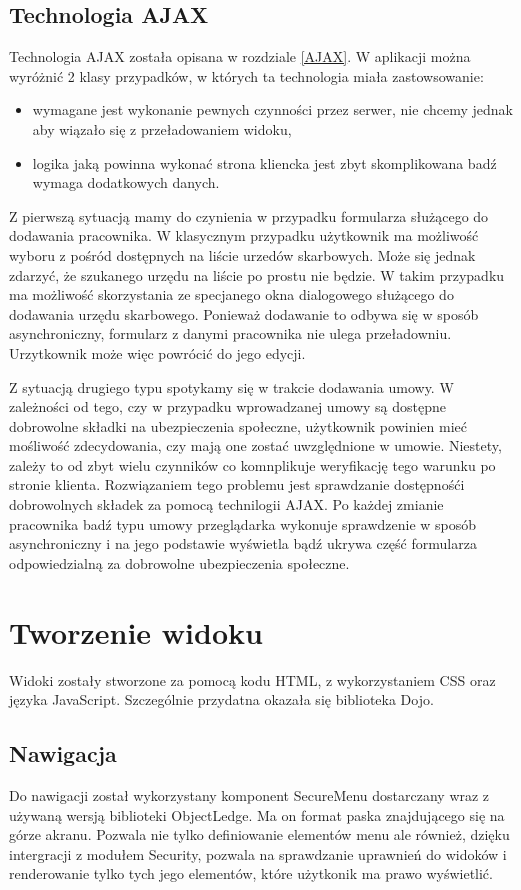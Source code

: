 \subsection[Technologia AJAX][Technologia AJAX]{Technologia AJAX}
Technologia AJAX została opisana w rozdziale \ref{AJAX}. W aplikacji można wyróżnić 2 klasy przypadków, w których ta technologia miała zastowsowanie:
\begin{itemize}
	\item wymagane jest wykonanie pewnych czynności przez serwer, nie chcemy jednak aby wiązało się z przeładowaniem widoku,
	\item logika jaką powinna wykonać strona kliencka jest zbyt skomplikowana badź wymaga dodatkowych danych.
\end{itemize}
Z pierwszą sytuacją mamy do czynienia w przypadku formularza służącego do dodawania pracownika. W klasycznym przypadku użytkownik ma możliwość wyboru z pośród dostępnych na liście urzedów skarbowych. Może się jednak zdarzyć, że szukanego urzędu na liście po prostu nie będzie. W takim przypadku ma możliwość skorzystania ze specjanego okna dialogowego służącego do dodawania urzędu skarbowego. Ponieważ dodawanie to odbywa się w sposób asynchroniczny, formularz z danymi pracownika nie ulega przeładowniu. Urzytkownik może więc powrócić do jego edycji.

Z sytuacją drugiego typu spotykamy się w trakcie dodawania umowy. W zależności od tego, czy w przypadku wprowadzanej umowy są dostępne dobrowolne składki na ubezpieczenia społeczne, użytkownik powinien mieć mośliwość zdecydowania, czy mają one zostać uwzględnione w umowie. Niestety, zależy to od zbyt wielu czynników co komnplikuje weryfikację tego warunku po stronie klienta. Rozwiązaniem tego problemu jest sprawdzanie dostępnośći dobrowolnych składek za pomocą technilogii AJAX. Po każdej zmianie pracownika badź typu umowy przeglądarka wykonuje sprawdzenie w sposób asynchroniczny i na jego podstawie wyświetla bądź ukrywa część formularza odpowiedzialną za dobrowolne ubezpieczenia społeczne.

\section[Tworzenie widoku][Tworzenie widoku]{Tworzenie widoku}
Widoki zostały stworzone za pomocą kodu HTML, z wykorzystaniem CSS oraz języka JavaScript. Szczególnie przydatna okazała się biblioteka Dojo.

\subsection[Nawigacja][Nawigacja]{Nawigacja}
Do nawigacji został wykorzystany komponent SecureMenu dostarczany wraz z używaną wersją biblioteki ObjectLedge. Ma on format paska znajdującego się na górze akranu. Pozwala nie tylko definiowanie elementów menu ale również, dzięku intergracji z modułem Security, pozwala na sprawdzanie uprawnień do widoków i renderowanie tylko tych jego elementów, które użytkonik ma prawo wyświetlić.

